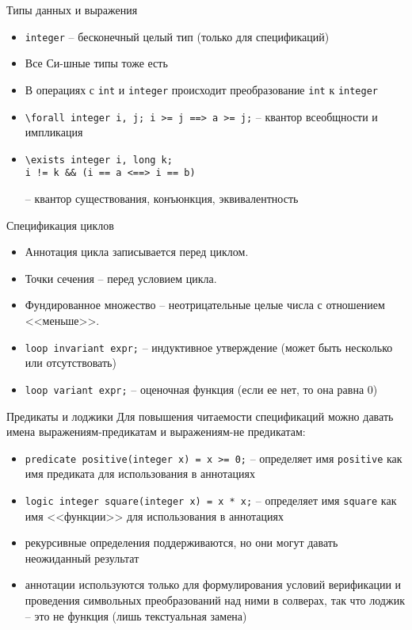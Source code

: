 \documentclass[hyperref={unicode=true}]{beamer}
\begin{document}
    \begin{frame}[fragile]{Типы данных и выражения}
    \begin{itemize}
    \item
    \verb|integer| -- бесконечный целый тип (только для спецификаций)
    \item
    Все Си-шные типы тоже есть
    \item
    В операциях с \verb|int| и \verb|integer| происходит преобразование
    \verb|int| к \verb|integer|
    \item
    \verb|\forall integer i, j; i >= j ==> a >= j;| -- квантор
    всеобщности и импликация
    \item
    \begin{verbatim}\exists integer i, long k;
i != k && (i == a <==> i == b)\end{verbatim} --
    квантор существования, конъюнкция, эквивалентность
    \end{itemize}
    \end{frame}

    \begin{frame}[fragile]{Спецификация циклов}
    \begin{itemize}
    \item
    Аннотация цикла записывается перед циклом.
    \item
    Точки сечения -- перед условием цикла.
    \item
    Фундированное множество -- неотрицательные целые числа
    с отношением <<меньше>>.
    \item
    \verb|loop invariant expr;| -- индуктивное утверждение
    (может быть несколько или отсутствовать)
    \item
    \verb|loop variant expr;| -- оценочная функция
    (если ее нет, то она равна 0)
    \end{itemize}
    \end{frame}

    \begin{frame}[fragile]{Предикаты и лоджики}
    Для повышения читаемости спецификаций можно давать имена
    выражениям-предикатам и выражениям-не предикатам:
    \begin{itemize}
    \item
    \verb|predicate positive(integer x) = x >= 0;| --
    определяет имя \verb|positive| как имя предиката для использования в аннотациях
    \item
    \verb|logic integer square(integer x) = x * x;| --
    определяет имя \verb|square| как имя <<функции>> для использования в аннотациях
    \item
    рекурсивные определения поддерживаются, но они могут давать неожиданный результат
    \item
    аннотации используются только для формулирования условий
    верификации и проведения символьных преобразований над ними
    в солверах, так что лоджик -- это не функция (лишь текстуальная замена)
    \end{itemize}
    \end{frame}
\end{document}
